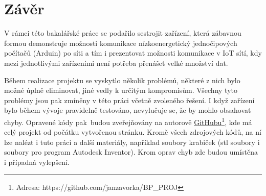 \section{Závěr}
V rámci této bakalářské práce se podařilo sestrojit zařízení, která zábavnou formou demonstruje možnosti komunikace nízkoenergetický jednočipových počítačů (Arduin) po síti a tím i prezentovat možnosti komunikace v IoT sítí, kdy mezi jednotlivými zařízeními není potřeba přenášet velké množství dat.

Během realizace projektu se vyskytlo několik problémů, některé z nich bylo možné úplně eliminovat, jiné vedly k určitým kompromisům. Všechny tyto problémy jsou pak zmíněny v této práci včetně zvoleného řešení. I když zařízení bylo během vývoje pravidelně testováno, nevylučuje se, že by mohlo obsahovat chyby. Opravené kódy pak~budou zveřejňovány na autorově \href{https://github.com/janzavorka/BP_PROJ}{GitHubu}\footnote{Adresa: https://github.com/janzavorka/BP\_PROJ}, kde má celý projekt od počátku vytvořenou stránku. Kromě všech zdrojových kódů, na ní lze nalézt i tuto práci a další materiály, například soubory krabiček (stl soubory i soubory pro program Autodesk Inventor). Krom oprav chyb zde budou umístěna i případná vylepšení.
